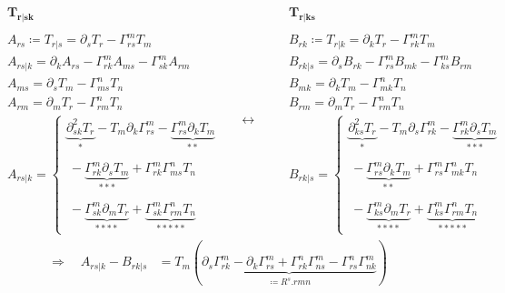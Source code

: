 \begin{equation}
  \begin{split}
  \ & \boldsymbol{T_{r|sk}}\\\\
  \ & A_{rs} \coloneqq T_{r|s} = \partial_{s}T_r - \Gamma^m_{rs}T_m\\
  \ & A_{rs|k}= \partial_k A_{rs} - \Gamma^m_{rk}A_{ms} -  \Gamma^m_{sk}A_{rm}\\
  \ & A_{ms}=  \partial_{s}T_m - \Gamma^n_{ms}T_n\\
  \ & A_{rm} = \partial_{m}T_r - \Gamma^n_{rm}T_n\\
  \ & A_{rs|k}= \left \{\begin{array}{l}
   \underbrace{\partial^2_{sk}T_r}_{*} - T_m\partial_{k}\Gamma^m_{rs} - \underbrace{\Gamma^m_{rs}\partial_{k}T_m}_{**} \\\\
   \ -\underbrace{\Gamma^m_{rk}\partial_{s}T_m}_{***} +\Gamma^m_{rk} \Gamma^n_{ms}T_n \\\\
   \ - \underbrace{\Gamma^m_{sk}\partial_{m}T_r}_{****} +\underbrace{\Gamma^m_{sk} \Gamma^n_{rm}T_n}_{*****}
  \end{array}\right.
  \end{split}
\quad\leftrightarrow\quad
  \begin{split}
 \ & \boldsymbol{T_{r|ks}}\\\\
  \ & B_{rk} \coloneqq T_{r|k} = \partial_{k}T_r - \Gamma^m_{rk}T_m\\
  \ & B_{rk|s}= \partial_s B_{rk} - \Gamma^m_{rs}B_{mk} -  \Gamma^m_{ks}B_{rm}\\
  \ & B_{mk}=  \partial_{k}T_m - \Gamma^n_{mk}T_n\\
  \ & B_{rm}=  \partial_{m}T_r - \Gamma^n_{rm}T_n\\
  \ & B_{rk|s}= \left \{\begin{array}{l}
  \underbrace{\partial^2_{ks}T_r}_{*} - T_m\partial_{s}\Gamma^m_{rk} - \underbrace{\Gamma^m_{rk}\partial_{s}T_m}_{***} \\\\
   \ -\underbrace{\Gamma^m_{rs}\partial_{k}T_m}_{**} +\Gamma^m_{rs} \Gamma^n_{mk}T_n \\\\
   \ - \underbrace{\Gamma^m_{ks}\partial_{m}T_r}_{****} +\underbrace{\Gamma^m_{ks} \Gamma^n_{rm}T_n}_{*****}
  \end{array}\right.
  \end{split}
\end{equation}\begin{align}
\Rightarrow\quad A_{rs|k} - B_{rk|s} &= T_m\left( \underbrace{\partial_{s}\Gamma^m_{rk}-\partial_{k}\Gamma^m_{rs}+\Gamma^n_{rk} \Gamma^m_{ns}- \Gamma^n_{rs} \Gamma^m_{nk} }_{\coloneqq R^s{.rmn}}\right) 
\end{align}
